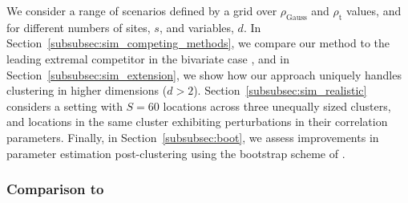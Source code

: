 \documentclass[12pt]{article}
\newcommand{\rhou}[1]{\rho_{\text{#1}}}
\begin{document}
We consider a range of scenarios defined by a grid over $\rhou{Gauss}$ and $\rhou{t}$ values, and for different numbers of sites, $s$,  and variables, $d$.
In Section~\ref{subsubsec:sim_competing_methods}, we compare our method to the leading extremal competitor in the bivariate case \citep{Vignotto2021}, and in Section~\ref{subsubsec:sim_extension}, we show how our approach uniquely handles clustering in higher dimensions ($d > 2$).
Section~\ref{subsubsec:sim_realistic} considers a setting with $S = 60$ locations across three unequally sized clusters, and locations in the same cluster exhibiting perturbations in their correlation parameters.
Finally, in Section~\ref{subsubsec:boot}, we assess improvements in parameter estimation post-clustering using the bootstrap scheme of \citet{Heffernan2004}.  

\subsubsection{Comparison to \citet{Vignotto2021}}~\label{subsubsec:sim_competing_methods}
\end{document}
